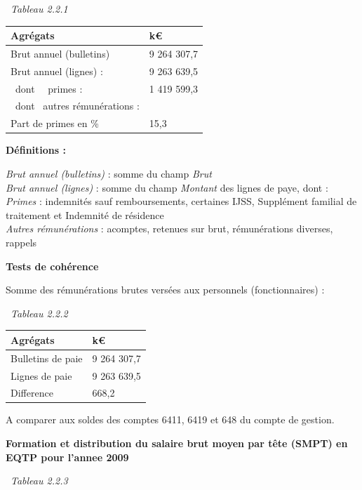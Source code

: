~\emph{Tableau 2.2.1}

\begin{longtable}[]{@{}ll@{}}
\toprule
Agrégats & k€\tabularnewline
\midrule
\endhead
Brut annuel (bulletins) & 9 264 307,7\tabularnewline
Brut annuel (lignes) : & 9 263 639,5\tabularnewline
~dont ~~primes : & 1 419 599,3\tabularnewline
~dont ~autres rémunérations : &\tabularnewline
Part de primes en \% & 15,3\tabularnewline
\bottomrule
\end{longtable}

\textbf{Définitions :}

\emph{Brut annuel (bulletins)} : somme du champ \emph{Brut}\\
\emph{Brut annuel (lignes)} : somme du champ \emph{Montant} des lignes
de paye, dont :\\
\emph{Primes} : indemnités sauf remboursements, certaines IJSS,
Supplément familial de traitement et Indemnité de résidence\\
\emph{Autres rémunérations} : acomptes, retenues sur brut, rémunérations
diverses, rappels

\textbf{Tests de cohérence}

Somme des rémunérations brutes versées aux personnels (fonctionnaires) :

~\emph{Tableau 2.2.2}

\begin{longtable}[]{@{}ll@{}}
\toprule
Agrégats & k€\tabularnewline
\midrule
\endhead
Bulletins de paie & 9 264 307,7\tabularnewline
Lignes de paie & 9 263 639,5\tabularnewline
Difference & 668,2\tabularnewline
\bottomrule
\end{longtable}

A comparer aux soldes des comptes 6411, 6419 et 648 du compte de
gestion.

\textbf{Formation et distribution du salaire brut moyen par tête (SMPT)
en EQTP pour l'annee 2009 }

~\emph{Tableau 2.2.3}

